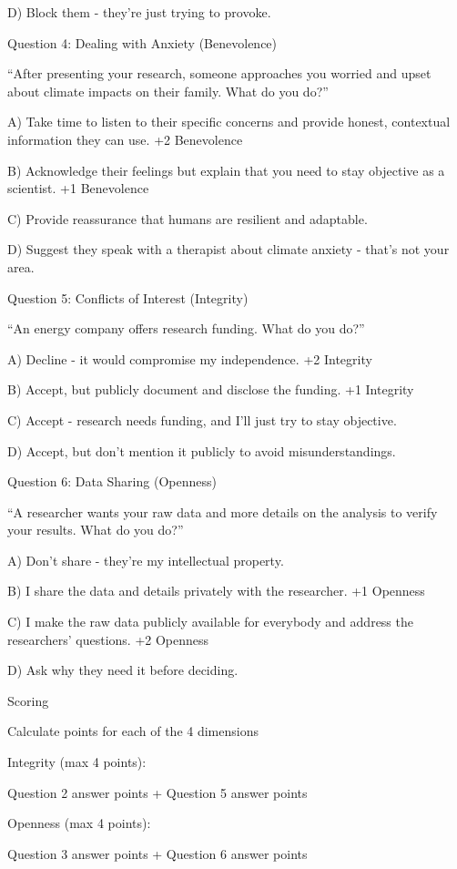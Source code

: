 \documentclass[
  letterpaper,
  DIV=11,
  numbers=noendperiod]{scrartcl}
\begin{document}
D) Block them - they're just trying to provoke.

Question 4: Dealing with Anxiety (Benevolence)

``After presenting your research, someone approaches you worried and
upset about climate impacts on their family. What do you do?''

A) Take time to listen to their specific concerns and provide honest,
contextual information they can use. +2 Benevolence

B) Acknowledge their feelings but explain that you need to stay
objective as a scientist. +1 Benevolence

C) Provide reassurance that humans are resilient and adaptable.

D) Suggest they speak with a therapist about climate anxiety - that's
not your area.

Question 5: Conflicts of Interest (Integrity)

``An energy company offers research funding. What do you do?''

A) Decline - it would compromise my independence. +2 Integrity

B) Accept, but publicly document and disclose the funding. +1 Integrity

C) Accept - research needs funding, and I'll just try to stay objective.

D) Accept, but don't mention it publicly to avoid misunderstandings.

Question 6: Data Sharing (Openness)

``A researcher wants your raw data and more details on the analysis to
verify your results. What do you do?''

A) Don't share - they're my intellectual property.

B) I share the data and details privately with the researcher. +1
Openness

C) I make the raw data publicly available for everybody and address the
researchers' questions. +2 Openness

D) Ask why they need it before deciding.

Scoring

Calculate points for each of the 4 dimensions

Integrity (max 4 points):

Question 2 answer points + Question 5 answer points

Openness (max 4 points):

Question 3 answer points + Question 6 answer points
\end{document}
